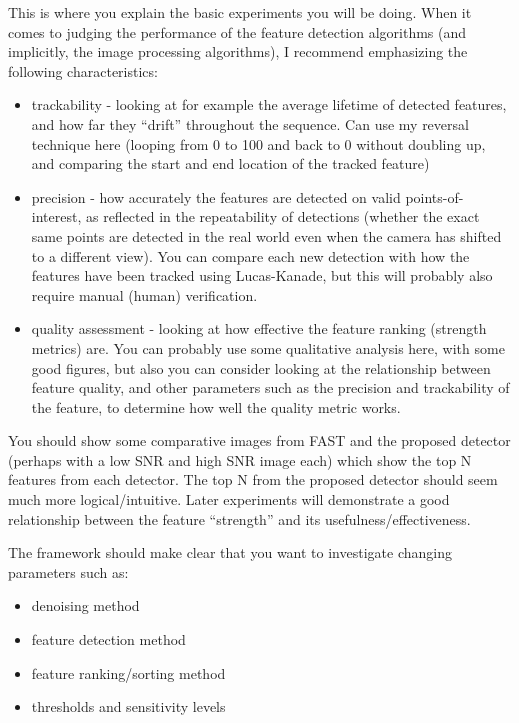 This is where you explain the basic experiments you will be doing. When it comes to judging the performance of the feature detection algorithms (and implicitly, the image processing algorithms), I recommend emphasizing the following characteristics:

\begin{itemize}
	\item trackability - looking at for example the average lifetime of detected features, and how far they "`drift"' throughout the sequence. Can use my reversal technique here (looping from 0 to 100 and back to 0 without doubling up, and comparing the start and end location of the tracked feature)
	\item precision - how accurately the features are detected on valid points-of-interest, as reflected in the repeatability of detections (whether the exact same points are detected in the real world even when the camera has shifted to a different view). You can compare each new detection with how the features have been tracked using Lucas-Kanade, but this will probably also require manual (human) verification.
	\item quality assessment - looking at how effective the feature ranking (strength metrics) are. You can probably use some qualitative analysis here, with some good figures, but also you can consider looking at the relationship between feature quality, and other parameters such as the precision and trackability of the feature, to determine how well the quality metric works.
\end{itemize}

You should show some comparative images from FAST and the proposed detector (perhaps with a low SNR and high SNR image each) which show the top N features from each detector. The top N from the proposed detector should seem much more logical/intuitive. Later experiments will demonstrate a good relationship between the feature "`strength"' and its usefulness/effectiveness.

The framework should make clear that you want to investigate changing parameters such as:

\begin{itemize}
	\item denoising method
	\item feature detection method
	\item feature ranking/sorting method
	\item thresholds and sensitivity levels
\end{itemize}